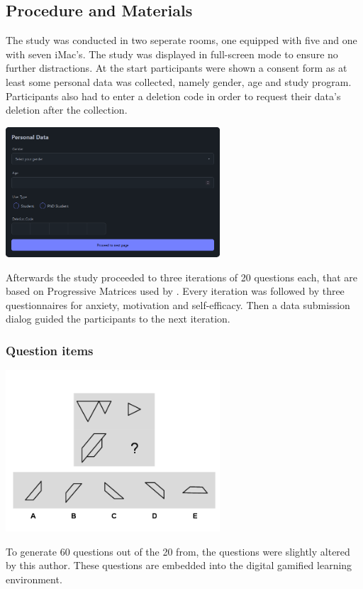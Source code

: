 \subsection{Procedure and Materials}
The study was conducted in two seperate rooms, one equipped with five and one with seven iMac's. The study was displayed in full-screen mode to ensure no further distractions.
At the start participants were shown a consent form as at least some personal data was collected, namely gender, age and study program. Participants also had to enter a deletion code in order to request their data's deletion after the collection.
\begin{minipage}{\textwidth}
  \includegraphics[width=0.6\textwidth]{img/details.png}
  \label{fig:figureDetails}
\end{minipage}
Afterwards the study proceeded to three iterations of 20 questions each, that are based on Progressive Matrices used by \Textcite{albuquerqueDoesGenderStereotype2017}.
Every iteration was followed by three questionnaires for anxiety, motivation and self-efficacy. Then a data submission dialog guided the participants to the next iteration.
\subsubsection{Question items}
\begin{minipage}{\textwidth}
  \includegraphics[width=0.6\textwidth]{img/q-17.png}
  \label{fig:figureMatrix}
\end{minipage}
To generate 60 questions out of the 20 from\textcite{albuquerqueDoesGenderStereotype2017}, the questions were slightly altered by this author.
These questions are embedded into the digital gamified learning environment.

